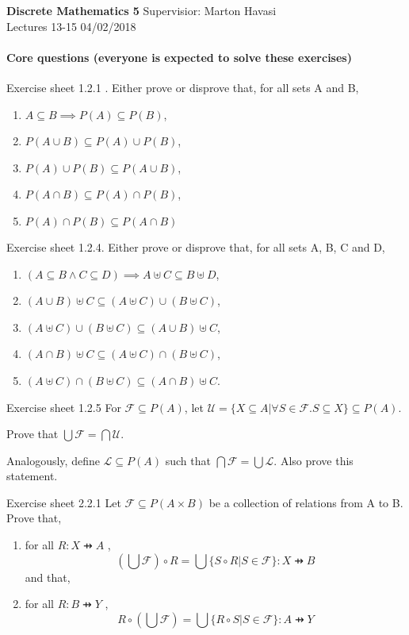 \documentclass{exam}
\begin{document}
\noindent
\large\textbf{Discrete Mathematics 5} \hfill Supervisior: Marton Havasi \\
\normalsize Lectures 13-15 \hfill 04/02/2018

\paragraph{Core questions (everyone is expected to solve these exercises)}
\begin{questions}

\question Exercise sheet 1.2.1 . Either prove or disprove that, for all sets A and B,
\begin{enumerate}[label=(\alph*)]
\item $A \subseteq B \implies P(A) \subseteq P(B)$,
\item $P(A \cup B) \subseteq P(A) \cup P(B)$,
\item $P(A) \cup P(B) \subseteq P(A \cup B)$,
\item $P(A \cap B) \subseteq P(A) \cap P(B)$,
\item $P(A) \cap P(B) \subseteq P(A \cap B)$
\end{enumerate} 

\question Exercise sheet 1.2.4. Either prove or disprove that, for all sets A, B, C and D,
\begin{enumerate}[label=(\alph*)]
\item $(A \subseteq B \wedge C \subseteq D) \implies A \uplus C \subseteq B \uplus D$,
\item $(A \cup B) \uplus C \subseteq (A \uplus C) \cup (B \uplus C)$,
\item $(A \uplus C) \cup (B \uplus C) \subseteq (A \cup B) \uplus C$,
\item $(A \cap B) \uplus C \subseteq (A \uplus C) \cap (B \uplus C)$,
\item $(A \uplus C) \cap (B \uplus C) \subseteq (A \cap B) \uplus C$.
\end{enumerate}

\question Exercise sheet 1.2.5 For $\mathcal{F} \subseteq P(A)$, let 
$\mathcal{U}=\{X \subseteq A | \forall S \in \mathcal{F}. S \subseteq X\} \subseteq P(A)$.

 Prove that $\bigcup \mathcal{F} = \bigcap \mathcal{U}$.
 
Analogously, define $\mathcal{L} \subseteq P(A)$ such that $\bigcap \mathcal{F} = \bigcup \mathcal{L}$. Also prove this statement.

\question Exercise sheet 2.2.1 Let $\mathcal{F} \subseteq P(A \times B)$ be a collection of relations from A to B. Prove that,
\begin{enumerate}[label=(\alph*)]
\item for all $R : X \pfun A$ ,
$$(\bigcup \mathcal{F}) \circ R = \bigcup \{S \circ R | S \in \mathcal{ F} \} : X \pfun B	$$
and that,
\item for all $R : B \pfun Y$ ,
$$R \circ (\bigcup \mathcal{F}) = \bigcup \{R \circ S | S \in \mathcal{ F} \} : A \pfun Y	$$
\end{enumerate}


\end{questions}
\end{document}
